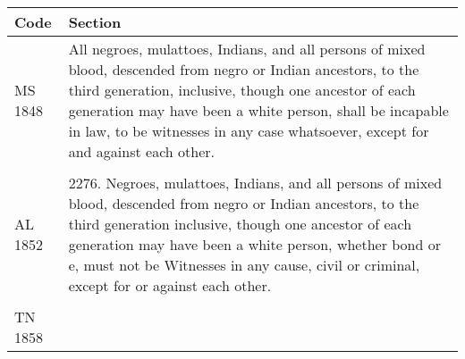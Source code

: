 \documentclass[12pt,]{article}
\begin{document}
\begin{longtable}[]{@{}ll@{}}
\toprule
\begin{minipage}[b]{0.20\columnwidth}\raggedright
Code\strut
\end{minipage} & \begin{minipage}[b]{0.74\columnwidth}\raggedright
Section\strut
\end{minipage}\tabularnewline
\midrule
\endhead
\begin{minipage}[t]{0.20\columnwidth}\raggedright
MS 1848\strut
\end{minipage} & \begin{minipage}[t]{0.74\columnwidth}\raggedright
All negroes, mulattoes, Indians, and all persons of mixed blood,
descended from negro or Indian ancestors, to the third generation,
inclusive, though one ancestor of each generation may have been a white
person, shall be incapable in law, to be witnesses in any case
whatsoever, except for and against each other.\strut
\end{minipage}\tabularnewline
\begin{minipage}[t]{0.20\columnwidth}\raggedright
\strut
\end{minipage} & \begin{minipage}[t]{0.74\columnwidth}\raggedright
\strut
\end{minipage}\tabularnewline
\begin{minipage}[t]{0.20\columnwidth}\raggedright
AL 1852\strut
\end{minipage} & \begin{minipage}[t]{0.74\columnwidth}\raggedright
2276. Negroes, mulattoes, Indians, and all persons of mixed blood,
descended from negro or Indian ancestors, to the third generation
inclusive, though one ancestor of each generation may have been a white
person, whether bond or e, must not be Witnesses in any cause, civil or
criminal, except for or against each other.\strut
\end{minipage}\tabularnewline
\begin{minipage}[t]{0.20\columnwidth}\raggedright
\strut
\end{minipage} & \begin{minipage}[t]{0.74\columnwidth}\raggedright
\strut
\end{minipage}\tabularnewline
\begin{minipage}[t]{0.20\columnwidth}\raggedright
TN 1858\strut
\end{minipage} & \begin{minipage}[t]{0.74\columnwidth}\raggedright

\end{minipage}
\end{longtable}
\end{document}
